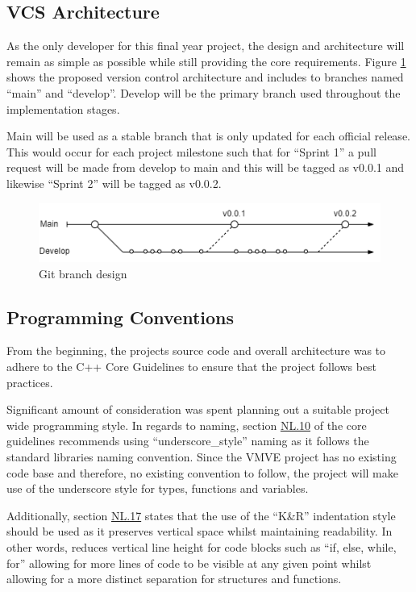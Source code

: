 \documentclass[11pt]{article}
\begin{document}
\subsection{VCS Architecture}

As the only developer for this final year project, the design and architecture
will remain as simple as possible while still providing the core requirements.
Figure \ref{fig:brancharch} shows the proposed version control architecture and
includes to branches named ``main'' and ``develop''. Develop will be the primary
branch used throughout the implementation stages. 

Main will be used as a stable branch that is only updated for each official release.
This would occur for each project milestone such that for ``Sprint 1'' a pull request
will be made from develop to main and this will be tagged as v0.0.1 and likewise 
``Sprint 2'' will be tagged as v0.0.2.

\begin{figure}[h!]
  \centering
  \includegraphics[width=\textwidth]{images/current_branch_design.png}
  \caption{Git branch design}
  \label{fig:brancharch}
\end{figure}

\subsection{Programming Conventions}
From the beginning, the projects source code and overall architecture was to
adhere to the C++ Core Guidelines \cite{cpp-guidelines} to ensure that the
project follows best practices.

Significant amount of consideration was spent planning out a suitable project
wide programming style. In regards to naming, section
\href{http://isocpp.github.io/CppCoreGuidelines/CppCoreGuidelines#nl10-prefer-underscore_style-names}{NL.10}
of the core guidelines recommends using ``underscore\_style'' naming as it follows
the standard libraries naming convention. Since the VMVE project has no existing
code base and therefore, no existing convention to follow, the project will
make use of the underscore style for types, functions and variables. 

Additionally, section
\href{https://isocpp.github.io/CppCoreGuidelines/CppCoreGuidelines#nl17-use-kr-derived-layout}{NL.17}
states that the use of the ``K\&R''  indentation style \cite{indentation} should
be used as it preserves vertical space whilst maintaining readability. In other
words, reduces vertical line height for code blocks such as ``if, else, while,
for'' allowing for more lines of code to be visible at any given point whilst
allowing for a more distinct separation for structures and functions.
\end{document}

